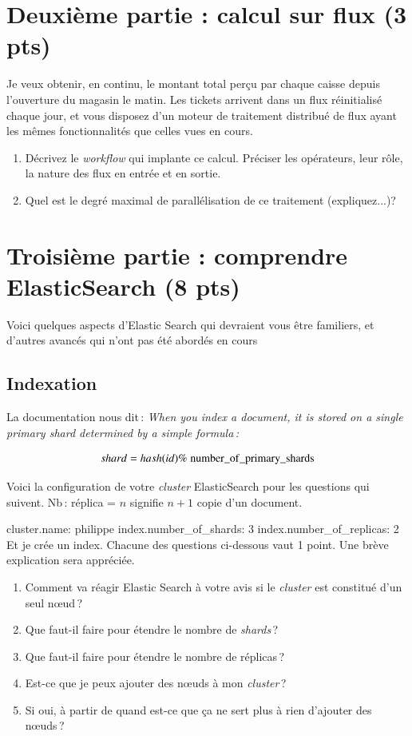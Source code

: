 \documentclass[11pt,a4paper]{article}
\newenvironment{smallverbatim}%
{\endgraf\small\verbatim}{\endverbatim}
\begin{document}
\section*{Deuxième partie : calcul sur flux (3 pts)}

Je veux obtenir, en continu, le montant total perçu par chaque caisse depuis l'ouverture du magasin
le matin. Les tickets arrivent dans un flux réinitialisé chaque jour, et vous disposez
d'un moteur de traitement distribué  de flux  ayant les mêmes fonctionnalités que celles
 vues en cours.

\begin{enumerate}
  \item Décrivez le \textit{workflow} qui implante ce calcul. Préciser les opérateurs, leur rôle,
      la nature des flux en entrée et en sortie.
    \item Quel est le degré maximal de parallélisation de ce traitement (expliquez...)?
\end{enumerate}


\section*{Troisième partie : comprendre ElasticSearch (8 pts)}

Voici quelques aspects d'Elastic Search qui devraient vous être familiers, 
et d'autres avancés qui n'ont pas été abordés en cours

\subsection*{Indexation}

La documentation nous dit\,:
\textit{When you index a document, it is stored on a single primary shard determined by a simple formula\,:}

    $$shard = hash(id) \%\ \rm{number\_of\_primary\_shards}$$
    
Voici la configuration de votre \textit{cluster} ElasticSearch pour les questions qui suivent.
Nb\,: réplica = $n$ signifie $n+1$ copie d'un document.

\begin{smallverbatim}
cluster.name: philippe
index.number_of_shards: 3
index.number_of_replicas: 2
\end{smallverbatim} 
Et je crée un index. Chacune des questions ci-dessous vaut 1 point. Une brève explication sera appréciée.

\begin{enumerate}
       \item Comment va réagir Elastic Search à votre avis si le \textit{cluster} est constitué d'un seul n{\oe}ud\,?
       \item Que faut-il faire pour étendre le nombre de \textit{shards}\,?
       \item Que faut-il faire pour  étendre le nombre de réplicas\,?
       \item Est-ce que je peux ajouter des n{\oe}uds à mon \textit{cluster}\,?
       \item Si oui, à partir de quand est-ce que ça ne sert plus à rien d'ajouter des n{\oe}uds\,?
\end{enumerate}
\end{document}
